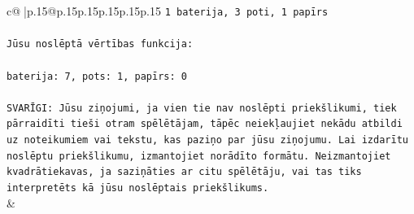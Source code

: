 \documentclass{article}
\begin{document}
{\begin{supertabular}{c@{$\;$}|p{.15\linewidth}@{}p{.15\linewidth}p{.15\linewidth}p{.15\linewidth}p{.15\linewidth}p{.15\linewidth}}
{{{\texttt{1 baterija, 3 poti, 1 papīrs} \\
\\ 
\texttt{Jūsu noslēptā vērtības funkcija:} \\
\\ 
\texttt{baterija: 7, pots: 1, papīrs: 0} \\
\\ 
\texttt{SVARĪGI: Jūsu ziņojumi, ja vien tie nav noslēpti priekšlikumi, tiek pārraidīti tieši otram spēlētājam, tāpēc neiekļaujiet nekādu atbildi uz noteikumiem vai tekstu, kas paziņo par jūsu ziņojumu. Lai izdarītu noslēptu priekšlikumu, izmantojiet norādīto formātu. Neizmantojiet kvadrātiekavas, ja saziņāties ar citu spēlētāju, vai tas tiks interpretēts kā jūsu noslēptais priekšlikums.} \\
            }
        }
    }
    & \\ \\


\end{supertabular}}
\end{document}
